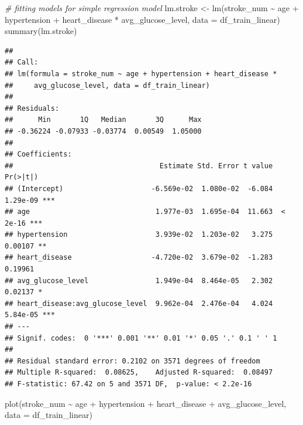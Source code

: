 \documentclass[
]{article}
\newenvironment{Shaded}{\begin{snugshade}}{\end{snugshade}}
\newcommand{\AttributeTok}[1]{\textcolor[rgb]{0.77,0.63,0.00}{#1}}
\newcommand{\CommentTok}[1]{\textcolor[rgb]{0.56,0.35,0.01}{\textit{#1}}}
\newcommand{\FunctionTok}[1]{\textcolor[rgb]{0.00,0.00,0.00}{#1}}
\newcommand{\NormalTok}[1]{#1}
\newcommand{\OtherTok}[1]{\textcolor[rgb]{0.56,0.35,0.01}{#1}}
\newcommand{\SpecialCharTok}[1]{\textcolor[rgb]{0.00,0.00,0.00}{#1}}
\renewcommand{\=}[1]{\stackrel{#1}{=}}
\theoremstyle{definition}
\theoremstyle{remark}
\begin{document}
\begin{Shaded}
\begin{Highlighting}[]
\CommentTok{\# fitting models for simple regression model}
\NormalTok{lm.stroke }\OtherTok{\textless{}{-}} \FunctionTok{lm}\NormalTok{(stroke\_num }\SpecialCharTok{\textasciitilde{}}\NormalTok{ age }\SpecialCharTok{+}\NormalTok{ hypertension }\SpecialCharTok{+}\NormalTok{ heart\_disease }\SpecialCharTok{*}\NormalTok{ avg\_glucose\_level, }\AttributeTok{data =}\NormalTok{ df\_train\_linear)}
\FunctionTok{summary}\NormalTok{(lm.stroke)}
\end{Highlighting}
\end{Shaded}

\begin{verbatim}
## 
## Call:
## lm(formula = stroke_num ~ age + hypertension + heart_disease * 
##     avg_glucose_level, data = df_train_linear)
## 
## Residuals:
##      Min       1Q   Median       3Q      Max 
## -0.36224 -0.07933 -0.03774  0.00549  1.05000 
## 
## Coefficients:
##                                   Estimate Std. Error t value Pr(>|t|)    
## (Intercept)                     -6.569e-02  1.080e-02  -6.084 1.29e-09 ***
## age                              1.977e-03  1.695e-04  11.663  < 2e-16 ***
## hypertension                     3.939e-02  1.203e-02   3.275  0.00107 ** 
## heart_disease                   -4.720e-02  3.679e-02  -1.283  0.19961    
## avg_glucose_level                1.949e-04  8.464e-05   2.302  0.02137 *  
## heart_disease:avg_glucose_level  9.962e-04  2.476e-04   4.024 5.84e-05 ***
## ---
## Signif. codes:  0 '***' 0.001 '**' 0.01 '*' 0.05 '.' 0.1 ' ' 1
## 
## Residual standard error: 0.2102 on 3571 degrees of freedom
## Multiple R-squared:  0.08625,    Adjusted R-squared:  0.08497 
## F-statistic: 67.42 on 5 and 3571 DF,  p-value: < 2.2e-16
\end{verbatim}

\begin{Shaded}
\begin{Highlighting}[]
\FunctionTok{plot}\NormalTok{(stroke\_num }\SpecialCharTok{\textasciitilde{}}\NormalTok{ age }\SpecialCharTok{+}\NormalTok{ hypertension }\SpecialCharTok{+}\NormalTok{ heart\_disease }\SpecialCharTok{+}\NormalTok{ avg\_glucose\_level, }\AttributeTok{data =}\NormalTok{ df\_train\_linear)}
\end{Highlighting}
\end{Shaded}
\end{document}
